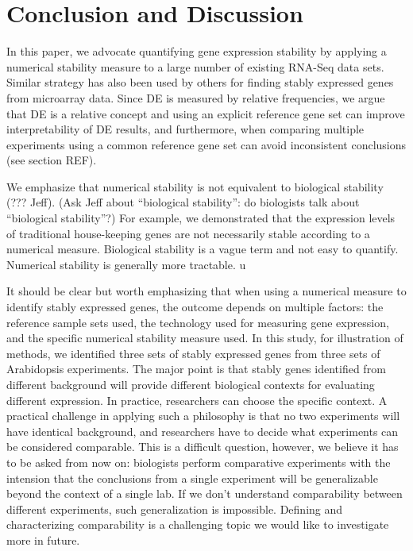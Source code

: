\documentclass[letterpaper,12pt]{article}
\begin{document}
  \section{Conclusion and Discussion}\label{section:discussion}
In this paper, we advocate quantifying gene expression stability by applying a
numerical stability measure to a large number of existing RNA-Seq data sets.
Similar strategy has also been used by others for finding stably expressed
genes from microarray data. Since DE is measured by relative frequencies, we
argue that DE is a relative concept and using an explicit reference gene set
can improve interpretability of DE results, and furthermore, when comparing
multiple experiments using a common reference gene set can avoid inconsistent
conclusions (see section REF).

We emphasize that numerical stability is not equivalent to biological
stability (??? Jeff).  (Ask Jeff about  ``biological stability'': do
biologists talk about ``biological stability''?) For example, we demonstrated
that the expression levels of traditional house-keeping genes are not
necessarily stable according to a numerical measure. 
Biological stability is a vague term and not easy to quantify.  Numerical
stability is generally more tractable.
u

It should be clear but worth emphasizing that when using a numerical measure
to identify stably expressed genes, the outcome depends on multiple factors:
the reference sample sets used, the technology used for measuring gene
expression, and the specific numerical stability measure used.  In this study,
for illustration of methods, we identified three sets of stably expressed
genes from three sets of Arabidopsis experiments. The major point is that
stably genes identified from different background will provide different
biological contexts for evaluating different expression. In practice,
researchers can choose the specific context. A practical challenge in applying
such a philosophy is that no two experiments will have identical background,
and researchers have to decide what experiments can be considered comparable. This
is a difficult question, however, we believe it has to be asked from now on:
biologists perform comparative experiments with the intension that the
conclusions from a single experiment will be generalizable beyond the context
of a single lab. If we don't understand comparability between different
experiments, such generalization is impossible. Defining and characterizing
comparability is a challenging topic we would like to investigate more in
future.
\end{document}
